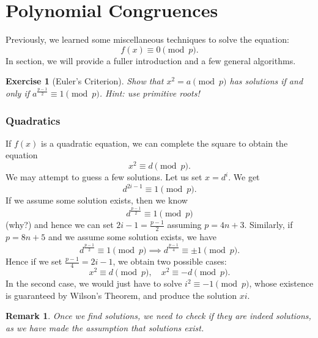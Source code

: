 \documentclass{article}
\newtheorem{exercise}{Exercise}
\newtheorem*{remark}{Remark}
\begin{document}
\section{Polynomial Congruences}
Previously, we learned some miscellaneous techniques to solve the equation:
\begin{equation}
    f(x) \equiv 0 \pmod{p}.
\end{equation}
In section, we will provide a fuller introduction and a few general algorithms.

\begin{exercise}[Euler's Criterion]
    Show that $x^{2} = a \pmod{p}$ has solutions if and only if $a^{\frac{p-1}{2}} \equiv 1 \pmod{p}$. Hint: use primitive roots!
\end{exercise}

\subsubsection{Quadratics}
If $f(x)$ is a quadratic equation, we can complete the square to obtain the equation
\begin{equation}
    x^{2} \equiv d \pmod{p}.
\end{equation}
We may attempt to guess a few solutions. Let us set $x = d^{i}$. We get
\begin{equation}
    d^{2i-1} \equiv 1 \pmod{p}.
\end{equation}
If we assume some solution exists, then we know
\begin{equation}
    d^{\frac{p-1}{2}} \equiv 1 \pmod{p}
\end{equation}
(why?) and hence we can set $2i-1 = \frac{p-1}{2}$ assuming $p = 4n + 3$. Similarly, if $p = 8n + 5$ and we assume some solution exists, we have
\begin{equation}
    d^{\frac{p-1}{2}} \equiv 1 \pmod{p}
    \implies
    d^{\frac{p-1}{4}} \equiv \pm 1 \pmod{p}.
\end{equation}
Hence if we set $\frac{p-1}{4} = 2i-1$, we obtain two possible cases:
\begin{equation}
    x^{2} \equiv d \pmod{p}, \quad x^{2} \equiv -d \pmod{p}.
\end{equation}
In the second case, we would just have to solve $i^{2} \equiv -1 \pmod{p}$, whose existence is guaranteed by Wilson's Theorem, and produce the solution $xi$. 
\begin{remark}
    Once we find solutions, we need to check if they are indeed solutions, as we have made the assumption that solutions exist.
\end{remark}
\end{document}

